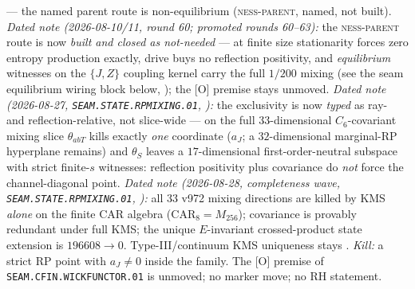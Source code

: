 \documentclass[11pt,a4paper]{article}
\begin{document}
{--- the named parent route is non-equilibrium
(\textsc{ness-parent}, named, not built).  \emph{Dated note
(2026-08-10/11, round 60; promoted rounds 60--63):} the
\textsc{ness-parent} route is now \emph{built and closed as
not-needed} --- at finite size stationarity forces zero entropy
production exactly, drive buys no reflection positivity, and
\emph{equilibrium} witnesses on the $\{J, Z\}$ coupling kernel
carry the full $1/200$ mixing (see the seam equilibrium wiring
block below, ); the [O]
premise stays unmoved.  \emph{Dated note (2026-08-27,
\texttt{SEAM.STATE.RPMIXING.01},
):} the exclusivity is
now \emph{typed} as ray- and reflection-relative, not
slice-wide --- on the full $33$-dimensional $C_6$-covariant
mixing slice $\theta_{abT}$ kills exactly \emph{one} coordinate
($a_J$; a $32$-dimensional marginal-RP hyperplane remains) and
$\theta_S$ leaves a $17$-dimensional first-order-neutral
subspace with strict finite-$s$ witnesses: reflection
positivity plus covariance do \emph{not} force the
channel-diagonal point.  \emph{Dated note (2026-08-28,
completeness wave, \texttt{SEAM.STATE.RPMIXING.01},
):} all $33$ v972 mixing
directions are killed by KMS \emph{alone} on the finite CAR algebra
($\mathrm{CAR}_8=M_{256}$); covariance is provably redundant under
full KMS; the unique $E$-invariant crossed-product state extension
is $196608\to 0$.  Type-III/continuum KMS uniqueness stays \mO.
\emph{Kill:} a strict
RP point with $a_J \ne 0$ inside the family.  The [O] premise of
\texttt{SEAM.CFIN.WICKFUNCTOR.01} is unmoved; no marker move; no
RH statement.\par}
\end{document}
